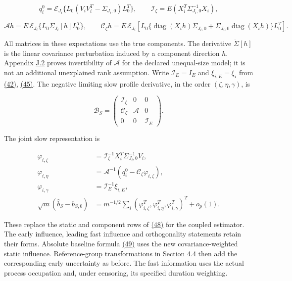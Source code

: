 \documentclass[11pt]{article}
\begin{document}
\begin{equation*}
q_i^0=\mathcal E_{J_i}\{L_0(V_iV_i^T-\Sigma_{J_i,0})L_0^T\},\qquad
\mathcal I_\zeta=E(X_i^T\Sigma_{J_i,0}^{-1}X_i),
\end{equation*}

\begin{equation*}
\mathcal A h=E\,\mathcal E_{J_i}\{L_0\dot\Sigma_{J_i}[h]L_0^T\},\qquad
\mathcal C_\zeta h=E\,\mathcal E_{J_i}\!\left[L_0\{\operatorname{diag}(X_ih)\Sigma_{J_i,0}+\Sigma_{J_i,0}\operatorname{diag}(X_ih)\}L_0^T\right].
\end{equation*}

All matrices in these expectations use the true components. The derivative \(\dot\Sigma[h]\) is the linear covariance perturbation induced by a component direction \(h\). Appendix \hyperref[sec:J.2]{J.2} proves invertibility of \(\mathcal A\) for the declared unequal-size model; it is not an additional unexplained rank assumption. Write \(\mathcal I_E=I_E\) and \(\xi_{i,E}=\xi_i\) from \hyperref[eq:42]{(42)}, \hyperref[eq:45]{(45)}. The negative limiting slow profile derivative, in the order \((\zeta,\eta,\gamma)\), is

\begin{equation*}
\mathcal B_S=
\begin{pmatrix}
\mathcal I_\zeta&0&0\\
\mathcal C_\zeta&\mathcal A&0\\
0&0&\mathcal I_E
\end{pmatrix}.
\tag{62}\label{eq:62}
\end{equation*}

The joint slow representation is

\begin{equation*}
\begin{aligned}
\varphi_{i,\zeta}&=\mathcal I_\zeta^{-1}X_i^T\Sigma_{J_i,0}^{-1}V_i,\\
\varphi_{i,\eta}&=\mathcal A^{-1}(q_i^0-\mathcal C_\zeta\varphi_{i,\zeta}),\\
\varphi_{i,\gamma}&=\mathcal I_E^{-1}\xi_{i,E},\\
\sqrt m(\widehat b_S-b_{S,0})
 &=m^{-1/2}\sum_i(\varphi_{i,\zeta}^T,
                   \varphi_{i,\eta}^T,\varphi_{i,\gamma}^T)^T+o_p(1).
\end{aligned}\tag{63}\label{eq:63}
\end{equation*}

These replace the static and component rows of \hyperref[eq:48]{(48)} for the coupled estimator. The early influence, leading fast influence and orthogonality statements retain their forms. Absolute baseline formula \hyperref[eq:49]{(49)} uses the new covariance-weighted static influence. Reference-group transformations in Section \hyperref[sec:4.4]{4.4} then add the corresponding early uncertainty as before. The fast information uses the actual process occupation and, under censoring, its specified duration weighting.
\end{document}
